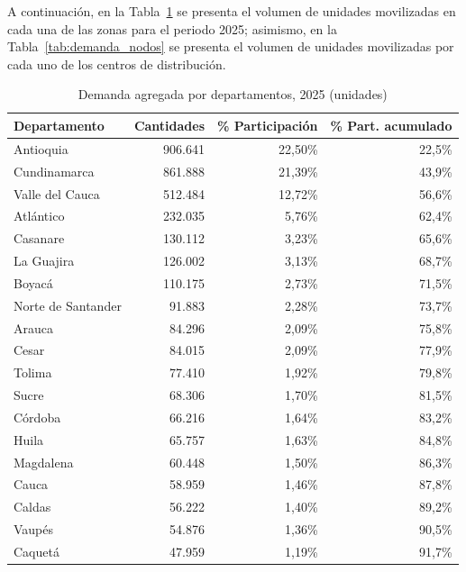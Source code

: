 \documentclass[fleqn, 11pt,letterpaper]{article}
\begin{document}
A continuación, en la Tabla~\ref{tab:demanda_departamentos} se presenta el volumen de unidades movilizadas en cada una de las zonas para el periodo 2025; asimismo, en la Tabla~\ref{tab:demanda_nodos} se presenta el volumen de unidades movilizadas por cada uno de los centros de distribución.

\raggedbottom
\begin{table}[H]
\centering
\caption{Demanda agregada por departamentos, 2025 (unidades)}
\label{tab:demanda_departamentos}
\small
\renewcommand{\arraystretch}{1.1}
\begin{tabular}{lrrr}
\toprule
\textbf{Departamento} & \textbf{Cantidades} & \textbf{\% Participación} & \textbf{\% Part. acumulado} \\
\midrule
Antioquia          & 906.641 & 22,50\% & 22,5\%  \\
Cundinamarca       & 861.888 & 21,39\% & 43,9\%  \\
Valle del Cauca    & 512.484 & 12,72\% & 56,6\%  \\
Atlántico          & 232.035 &  5,76\% & 62,4\%  \\
Casanare           & 130.112 &  3,23\% & 65,6\%  \\
La Guajira         & 126.002 &  3,13\% & 68,7\%  \\
Boyacá             & 110.175 &  2,73\% & 71,5\%  \\
Norte de Santander &  91.883 &  2,28\% & 73,7\%  \\
Arauca             &  84.296 &  2,09\% & 75,8\%  \\
Cesar              &  84.015 &  2,09\% & 77,9\%  \\
Tolima             &  77.410 &  1,92\% & 79,8\%  \\
Sucre              &  68.306 &  1,70\% & 81,5\%  \\
Córdoba            &  66.216 &  1,64\% & 83,2\%  \\
Huila              &  65.757 &  1,63\% & 84,8\%  \\
Magdalena          &  60.448 &  1,50\% & 86,3\%  \\
Cauca              &  58.959 &  1,46\% & 87,8\%  \\
Caldas             &  56.222 &  1,40\% & 89,2\%  \\
Vaupés             &  54.876 &  1,36\% & 90,5\%  \\
Caquetá            &  47.959 &  1,19\% & 91,7\%  \\

\end{tabular}
\end{table}
\end{document}
